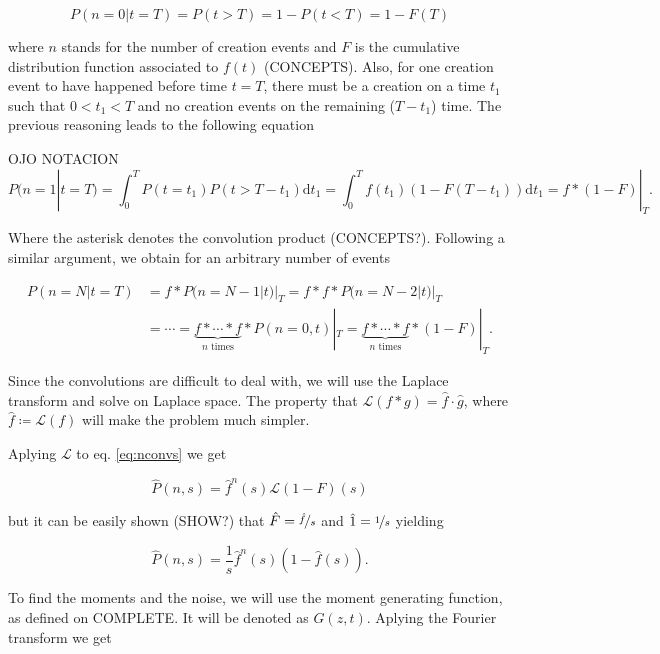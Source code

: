 \begin{equation}
P(n=0|t=T) = P(t>T) = 1 - P(t<T) = 1 - F(T)
\end{equation}

where $n$ stands for the number of creation events and $F$ is the cumulative distribution function associated to $f(t)$ (CONCEPTS). Also, for one creation event to have happened before time $t=T$, there must be a creation on a time $t_1$ such that $0<t_1<T$ and no creation events on the remaining ($T-t_1$) time. The previous reasoning leads to the following equation

OJO NOTACION
\begin{equation}
  P(n=1|t=T) = \int_0^TP(t=t_1)P(t>T-t_1)\mathrm{d}t_1 = \int_0^Tf(t_1)(1-F(T-t_1))\mathrm{d}t_1=f\ast (1-F)|_T.
\end{equation}

Where the asterisk denotes the convolution product (CONCEPTS?). Following a similar argument, we obtain for an arbitrary number of events

\begin{equation}
  \label{eq:nconvs}
  \begin{split}
    P(n=N|t=T) &= f\ast P(n=N-1|t)|_T = f\ast f\ast P(n=N-2|t)|_T \\
    &= \cdots = \underbrace{f\ast\cdots\ast f}_{n \text{ times}}\ast P(n=0,t)|_T = \underbrace{f\ast\cdots\ast f}_{n \text{ times}}\ast (1-F)|_T.
  \end{split}
\end{equation}

Since the convolutions are difficult to deal with, we will use the Laplace transform and solve on Laplace space. The property that $\mathcal{L}(f\ast g) = \hat{f}\cdot\hat{g}$, where $\hat{f}\coloneqq\mathcal{L}(f)$ will make the problem much simpler.

Aplying $\mathcal{L}$ to eq. \ref{eq:nconvs} we get

\begin{equation*}
  \hat{P}(n,s) = \hat{f}^n(s)\mathcal{L}(1-F)(s)
\end{equation*}

but it can be easily shown (SHOW?) that $\hat{F} = \nicefrac{\hat{f}}{s}$ and $\hat{1} = \nicefrac{1}{s}$ yielding

\begin{equation}
  \label{eq:lapP}
  \hat{P}(n,s) = \frac{1}{s}\hat{f}^n(s)(1-\hat{f}(s)).
\end{equation}

To find the moments and the noise, we will use the moment generating function, as defined on COMPLETE. It will be denoted as $G(z,t)$. Aplying the Fourier transform we get

